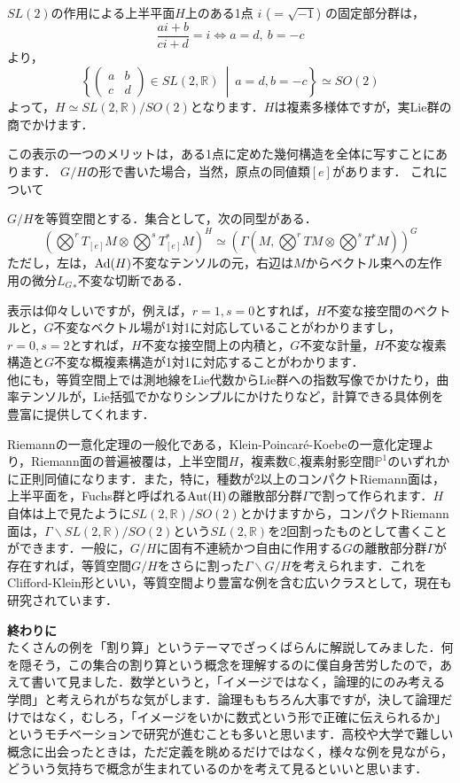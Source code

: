 \begin{Ex}[上半平面]
$SL(2)$の作用による上半平面$H$上のある1点 $i$ ($=\sqrt{-1}$) の固定部分群は，
 \[
  \frac{ai+b}{ci+d}=i\Leftrightarrow a=d,\ b=-c
 \]
より，
 \[
  \left\{\left(\begin{matrix}
   a&b\\c&d
  \end{matrix}\right)\in SL(2,\mathbb{R})\ \middle|\  a=d,b=-c\right\}\simeq SO(2)
 \]
よって，$H\simeq SL(2,\mathbb{R})/SO(2)$となります．$H$は複素多様体ですが，実Lie群の商でかけます．
\end{Ex}

この表示の一つのメリットは，ある1点に定めた幾何構造を全体に写すことにあります．
$G/H$の形で書いた場合，当然，原点の同値類$[e]$があります．
これについて
\begin{Lemma}\label{l4}
  $G/H$を等質空間とする．集合として，次の同型がある．
 \[
  (\bigotimes^rT_{[e]}M\otimes\bigotimes^sT^*_{[e]}M)^H\simeq (\Gamma(M,\bigotimes^rTM\otimes\bigotimes^sT^*M))^G
 \]
 ただし，左は，${\rm Ad}(H)$不変なテンソルの元，右辺は$M$からベクトル束への左作用の微分${L_{G}}_*$不変な切断である．
 \end{Lemma}
表示は仰々しいですが，例えば，$r=1,s=0$とすれば，$H$不変な接空間のベクトルと，$G$不変なベクトル場が1対1に対応していることがわかりますし，$r=0,s=2$とすれば，$H$不変な接空間上の内積と，$G$不変な計量，$H$不変な複素構造と$G$不変な概複素構造が1対1に対応することがわかります．\\
他にも，等質空間上では測地線をLie代数からLie群への指数写像でかけたり，曲率テンソルが，Lie括弧でかなりシンプルにかけたりなど，計算できる具体例を豊富に提供してくれます．


Riemannの一意化定理の一般化である，Klein-Poincar\'e-Koebeの一意化定理より，Riemann面の普遍被覆は，上半空間$H$，複素数$\mathbb{C}$,複素射影空間$\mathbb{P}^1$のいずれかに正則同値になります．また，特に，種数が2以上のコンパクトRiemann面は，上半平面を，Fuchs群と呼ばれる$\rm{Aut}(H)$の離散部分群$\Gamma$で割って作られます．$H$自体は上で見たように$SL(2,\mathbb{R})/SO(2)$とかけますから，コンパクトRiemann面は，$\Gamma\backslash SL(2,\mathbb{R})/SO(2)$という$SL(2,\mathbb{R})$を2回割ったものとして書くことができます．一般に，$G/H$に固有不連続かつ自由に作用する$G$の離散部分群$\Gamma$が存在すれば，等質空間$G/H$をさらに割った$\Gamma\backslash G/H$を考えられます．これをClifford-Klein形といい，等質空間より豊富な例を含む広いクラスとして，現在も研究されています．

{\bf 終わりに}\\
たくさんの例を「割り算」というテーマでざっくばらんに解説してみました．何を隠そう，この集合の割り算という概念を理解するのに僕自身苦労したので，あえて書いて見ました．数学というと，「イメージではなく，論理的にのみ考える学問」と考えられがちな気がします．論理ももちろん大事ですが，決して論理だけではなく，むしろ，「イメージをいかに数式という形で正確に伝えられるか」というモチベーションで研究が進むことも多いと思います．高校や大学で難しい概念に出会ったときは，ただ定義を眺めるだけではなく，様々な例を見ながら，どういう気持ちで概念が生まれているのかを考えて見るといいと思います．

